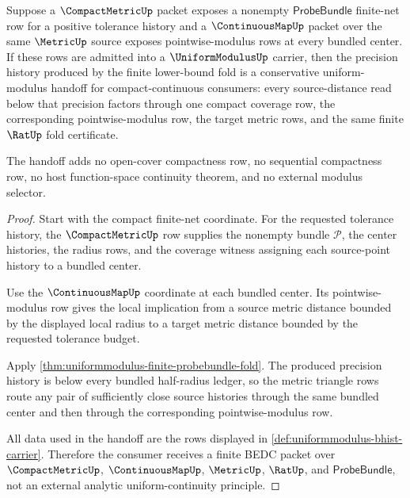 \begin{theorem}
\label{thm:uniformmodulus-compact-continuous-handoff}
Suppose a $\CompactMetricUp$ packet exposes a nonempty $\mathsf{ProbeBundle}$ finite-net row for a positive tolerance history and a $\ContinuousMapUp$ packet over the same $\MetricUp$ source exposes pointwise-modulus rows at every bundled center. If these rows are admitted into a $\UniformModulusUp$ carrier, then the precision history produced by the finite lower-bound fold is a conservative uniform-modulus handoff for compact-continuous consumers: every source-distance read below that precision factors through one compact coverage row, the corresponding pointwise-modulus row, the target metric rows, and the same finite $\RatUp$ fold certificate.

The handoff adds no open-cover compactness row, no sequential compactness row, no host function-space continuity theorem, and no external modulus selector.
\end{theorem}
\begin{proof}
Start with the compact finite-net coordinate. For the requested tolerance history, the $\CompactMetricUp$ row supplies the nonempty bundle $\mathcal{P}$, the center histories, the radius rows, and the coverage witness assigning each source-point history to a bundled center.

Use the $\ContinuousMapUp$ coordinate at each bundled center. Its pointwise-modulus row gives the local implication from a source metric distance bounded by the displayed local radius to a target metric distance bounded by the requested tolerance budget.

Apply \autoref{thm:uniformmodulus-finite-probebundle-fold}. The produced precision history is below every bundled half-radius ledger, so the metric triangle rows route any pair of sufficiently close source histories through the same bundled center and then through the corresponding pointwise-modulus row.

All data used in the handoff are the rows displayed in \autoref{def:uniformmodulus-bhist-carrier}. Therefore the consumer receives a finite BEDC packet over $\CompactMetricUp$, $\ContinuousMapUp$, $\MetricUp$, $\RatUp$, and $\mathsf{ProbeBundle}$, not an external analytic uniform-continuity principle.
\end{proof}


